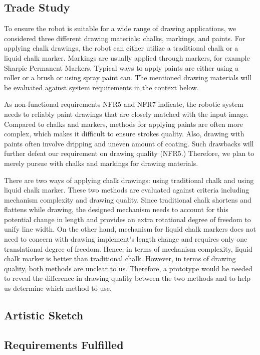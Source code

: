 \subsection{Trade Study}
To ensure the robot is suitable for a wide range of drawing applications, we considered three different drawing materials: chalks, markings, and paints. For applying chalk drawings, the robot can either utilize a traditional chalk or a liquid chalk marker. Markings are usually applied through markers, for example Sharpie Permanent Markers. Typical ways to apply paints are either using a roller or a brush or using spray paint can. The mentioned drawing materials will be evaluated against system requirements in the context below.

As non-functional requirements NFR5 and NFR7 indicate, the robotic system needs to reliably paint drawings that are closely matched with the input image. Compared to chalks and markers, methods for applying paints are often more complex, which makes it difficult to ensure strokes quality. Also, drawing with paints often involve dripping and uneven amount of coating. Such drawbacks will further defeat our requirement on drawing quality (NFR5.) Therefore, we plan to merely pursue with chalks and markings for drawing materials.

There are two ways of applying chalk drawings: using traditional chalk and using liquid chalk marker. These two methods are evaluated against criteria including mechanism complexity and drawing quality. Since traditional chalk shortens and flattens while drawing, the designed mechanism needs to account for this potential change in length and provides an extra rotational degree of freedom to unify line width. On the other hand, mechanism for liquid chalk markers does not need to concern with drawing implement’s length change and requires only one translational degree of freedom. Hence, in terms of mechanism complexity, liquid chalk marker is better than traditional chalk. However, in terms of drawing quality, both methods are unclear to us. Therefore, a prototype would be needed to reveal the difference in drawing quality between the two methods and to help us determine which method to use. 

\subsection{Artistic Sketch}

\subsection{Requirements Fulfilled}
